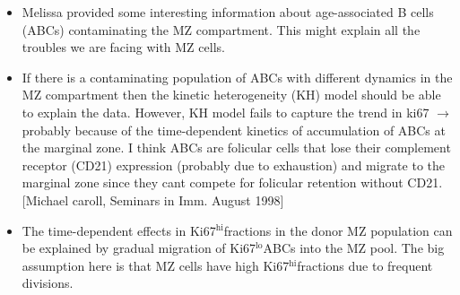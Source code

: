 \documentclass[11pt]{article}
\newcommand{\khi}{Ki67$^\text{hi}$}
\newcommand{\klo}{Ki67$^\text{lo}$}
\begin{document}
\begin{itemize}
	\item Melissa provided some interesting information about age-associated B cells (ABCs) contaminating the MZ compartment. This might explain all the troubles we are facing with MZ cells. 
	
	\item If there is a contaminating population of ABCs with different dynamics in the MZ compartment then the kinetic heterogeneity (KH) model should be able to explain the data. However, KH model fails to capture the trend in ki67 $\rightarrow$ probably because of the time-dependent kinetics of accumulation of ABCs at the marginal zone. I think ABCs are folicular cells that lose their complement receptor (CD21) expression (probably due to exhaustion) and migrate to the marginal zone since they cant compete for folicular retention without CD21. [Michael caroll, Seminars in Imm. August 1998]
	
	\item The time-dependent effects in \khi fractions in the donor MZ population can be explained by gradual migration of \klo ABCs into the MZ pool. The big assumption here is that MZ cells have high \khi fractions due to frequent divisions. 
	
	
\end{itemize}
\end{document}
